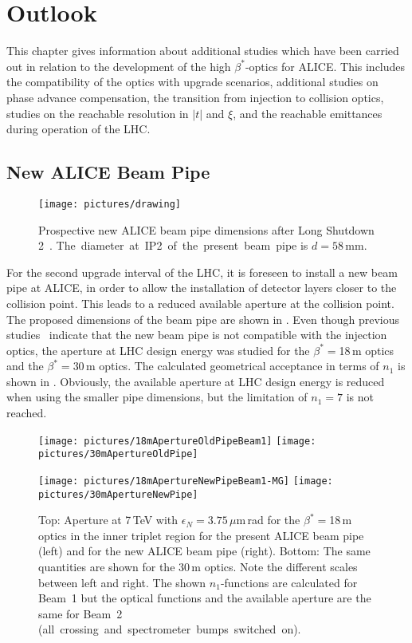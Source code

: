 \chapter{Outlook}\label{chap:outlook}
This chapter gives information about additional studies which have been carried out in relation to the development of the high $\beta^*$-optics for ALICE. This includes the compatibility of the optics with upgrade scenarios, additional studies on phase advance compensation, the transition from injection to collision optics, studies on the reachable resolution in $|t|$ and $\xi$, and the reachable emittances during operation of the LHC.
\section{New ALICE Beam Pipe}\label{chap:new_alice_beam_pipe}
\begin{figure}[b]
\centering
\texttt{[image: pictures/drawing]}
    \caption{Prospective new ALICE beam pipe dimensions after Long Shutdown 2~\cite{riegler_talk}. \mbox{The diameter at IP2 of the present beam pipe} is $d=58\,$mm.}
    \label{13012002}
\end{figure}
For the second upgrade interval of the LHC, it is foreseen to install a new beam pipe at ALICE, in order to allow the installation of detector layers closer to the collision point. This leads to a reduced available aperture at the collision point. The proposed dimensions of the beam pipe are shown in .  Even though previous studies~\cite{massimo_private} indicate that the new beam pipe is not compatible with the injection optics, the aperture at LHC design energy was studied for the $\beta^*=$18$\,$m optics and the $\beta^*=$30$\,$m optics. The calculated geometrical acceptance in terms of $n_1$ is shown in . Obviously, the available aperture  at LHC design energy is reduced when using the smaller pipe dimensions, but the limitation of $n_1=7$ is not reached. 
\begin{figure}[t]
\begin{minipage}[t]{0.5\linewidth}
\centering
\texttt{[image: pictures/18mApertureOldPipeBeam1]}
\texttt{[image: pictures/30mApertureOldPipe]}
\end{minipage}
\hspace{0.5cm}
\begin{minipage}[t]{0.5\linewidth}
\centering
\texttt{[image: pictures/18mApertureNewPipeBeam1-MG]}
\texttt{[image: pictures/30mApertureNewPipe]}
\end{minipage}
\caption{Top: Aperture at 7$\,$TeV with $\epsilon_N=3.75\,\mu$m$\,$rad for the $\beta^*=$18$\,$m optics in the inner triplet region for the present ALICE beam pipe (left) and for the new ALICE beam pipe (right). Bottom: The same quantities are shown for the 30$\,$m optics. Note the different scales between left and right. The shown $n_1$-functions are calculated for \mbox{Beam 1} but the optical functions and the available aperture are the same for \mbox{Beam 2} \mbox{(all crossing and spectrometer bumps switched on).} }
\label{fig:n1_new_pipe}
\end{figure}

